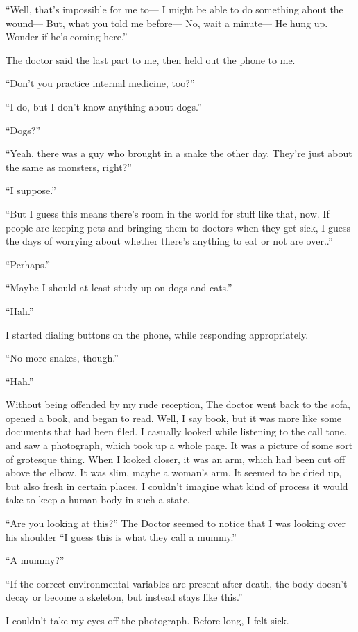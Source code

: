\documentclass[oneside]{book}
\begin{document}
“Well, that’s impossible for me to— I might be able to do something about the wound— But, what you told me before— No, wait a minute— He hung up. Wonder if he’s coming here.”

The doctor said the last part to me, then held out the phone to me.

“Don’t you practice internal medicine, too?”

“I do, but I don’t know anything about dogs.”

“Dogs?”

“Yeah, there was a guy who brought in a snake the other day. They’re just about the same as monsters, right?”

“I suppose.”

“But I guess this means there’s room in the world for stuff like that, now. If people are keeping pets and bringing them to doctors when they get sick, I guess the days of worrying about whether there’s anything to eat or not are over..”

“Perhaps.”

“Maybe I should at least study up on dogs and cats.”

“Hah.”

I started dialing buttons on the phone, while responding appropriately.

“No more snakes, though.”

“Hah.”

Without being offended by my rude reception, The doctor went back to the sofa, opened a book, and began to read. Well, I say book, but it was more like some documents that had been filed. I casually looked while listening to the call tone, and saw a photograph, which took up a whole page. It was a picture of some sort of grotesque thing. When I looked closer, it was an arm, which had been cut off above the elbow. It was slim, maybe a woman’s arm. It seemed to be dried up, but also fresh in certain places. I couldn’t imagine what kind of process it would take to keep a human body in such a state.

“Are you looking at this?” The Doctor seemed to notice that I was looking over his shoulder “I guess this is what they call a mummy.”

“A mummy?”

“If the correct environmental variables are present after death, the body doesn’t decay or become a skeleton, but instead stays like this.”

I couldn’t take my eyes off the photograph. Before long, I felt sick.
\end{document}
